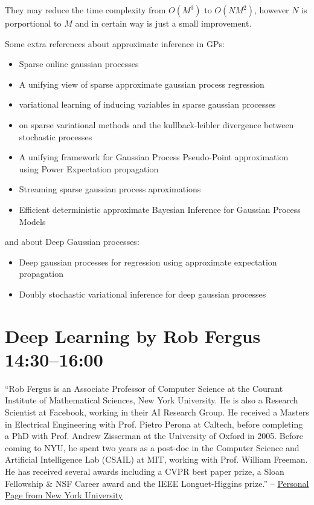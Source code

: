 \documentclass[b5paper]{report}
\begin{document}
They may reduce the time complexity from $O(M^3)$ to $O(NM^2)$, however $N$ is
porportional to $M$ and in certain way is just a small improvement.

Some extra references about approximate inference in GPs:

\begin{itemize}
  \item Sparse online gaussian processes
  \item A unifying view of sparse approximate gaussian process regression
  \item variational learning of inducing variables in sparse gaussian processes
  \item on sparse variational methods and the kullback-leibler divergence
    between stochastic processes
  \item A unifying framework for Gaussian Process Pseudo-Point approximation
    using Power Expectation propagation
  \item Streaming sparse gaussian process aproximations
  \item Efficient deterministic approximate Bayesian Inference for Gaussian
    Process Models
\end{itemize}


and about Deep Gaussian processes:

\begin{itemize}
  \item Deep gaussian processes for regression using approximate expectation
    propagation
  \item Doubly stochastic variational inference for deep gaussian processes
\end{itemize}


\chapter{Deep Learning by Rob Fergus 14:30--16:00}

``Rob Fergus is an Associate Professor of Computer Science at the Courant
Institute of Mathematical Sciences, New York University. He is also a Research
Scientist at Facebook, working in their AI Research Group. He received a
Masters in Electrical Engineering with Prof. Pietro Perona at Caltech, before
completing a PhD with Prof. Andrew Zisserman at the University of Oxford in
2005. Before coming to NYU, he spent two years as a post-doc in the Computer
Science and Artificial Intelligence Lab (CSAIL) at MIT, working with Prof.
William Freeman. He has received several awards including a CVPR best paper
prize, a Sloan Fellowship \& NSF Career award and the IEEE Longuet-Higgins
prize.'' -- \href{https://cs.nyu.edu/~fergus/pmwiki/pmwiki.php?n=PmWiki.Bio}{Personal
Page from New York University}
\end{document}
